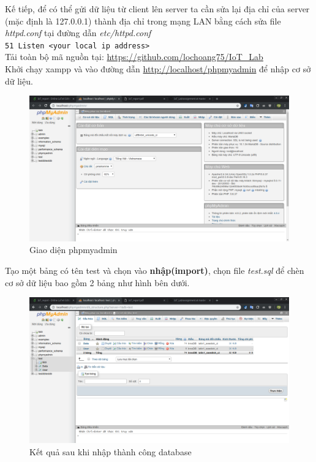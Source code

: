 \documentclass[a4paper]{article}
\begin{document}
    Kế tiếp, để có thể gửi dữ liệu từ client lên server ta cần sửa lại địa chỉ của server (mặc định là 127.0.0.1) thành địa chỉ trong mạng LAN bằng cách sửa file \textit{httpd.conf} tại đường dẫn \textit{etc/httpd.conf}\\
    
    \lstinline{51 Listen <your local ip address>}\\
    
    Tải toàn bộ mã nguồn tại: \url{https://github.com/lochoang75/IoT_Lab}\\
    
    Khởi chạy xampp và vào đường dẫn \url{http://localhost/phpmyadmin} để 
    nhập cơ sở dữ liệu.
    
    \begin{figure}[htp]
        \centering
        \includegraphics[scale=0.3]{phpmyadmin.png}
        \caption{Giao diện phpmyadmin}
        \label{fig:my_label}
    \end{figure}
    Tạo một bảng có tên test và chọn vào \textbf{nhập(import)}, chọn file \textit{test.sql} để chèn cơ sở dữ liệu bao gồm 2 bảng như hình bên dưới.
    \begin{figure}[htp]
        \centering
        \includegraphics[scale=0.3]{database.png}
        \caption{Kết quả sau khi nhập thành công database}
        \label{fig:my_label}
    \end{figure}
    
\end{document}
